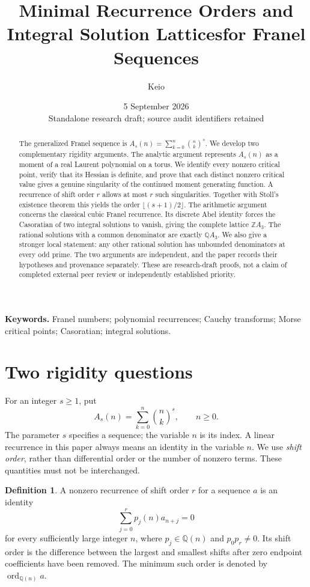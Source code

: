 \documentclass[11pt,a4paper]{article}
\author{Keio}
\date{5 September 2026\\\small Standalone research draft; source audit identifiers retained}
\title{Minimal Recurrence Orders and Integral Solution Lattices\newline for Franel Sequences}
\theoremstyle{definition}\newtheorem{definition}[theorem]{Definition}
\theoremstyle{remark}\newtheorem{remark}[theorem]{Remark}
\newcommand{\Q}{\mathbb Q}\newcommand{\Z}{\mathbb Z}\newcommand{\N}{\mathbb N}\newcommand{\R}{\mathbb R}\newcommand{\C}{\mathbb C}
\begin{document}
\maketitle
\begin{abstract}
The generalized Franel sequence is $A_s(n)=\sum_{k=0}^{n}\binom nk^s$.
We develop two complementary rigidity arguments. The analytic argument represents
$A_s(n)$ as a moment of a real Laurent polynomial on a torus. We identify every
nonzero critical point, verify that its Hessian is definite, and prove that each
distinct nonzero critical value gives a genuine singularity of the continued
moment generating function. A recurrence of shift order $r$ allows at most $r$
such singularities. Together with Stoll's existence theorem this yields the
order $\lfloor(s+1)/2\rfloor$. The arithmetic argument concerns the classical
cubic Franel recurrence. Its discrete Abel identity forces the Casoratian of two
integral solutions to vanish, giving the complete lattice $\Z A_3$. The rational
solutions with a common denominator are exactly $\Q A_3$. We also give a stronger
local statement: any other rational solution has unbounded denominators at
every odd prime. The two arguments are independent, and the paper records their
hypotheses and provenance separately. These are research-draft proofs, not a
claim of completed external peer review or independently established priority.
\end{abstract}
\noindent\textbf{Keywords.} Franel numbers; polynomial recurrences; Cauchy transforms;
Morse critical points; Casoratian; integral solutions.

\section{Two rigidity questions}
For an integer $s\ge1$, put
\begin{equation}\label{eq:defA}
 A_s(n)=\sum_{k=0}^{n}\binom nk^s,\qquad n\ge0.
\end{equation}
The parameter $s$ specifies a sequence; the variable $n$ is its index. A linear
recurrence in this paper always means an identity in the variable $n$. We use
\emph{shift order}, rather than differential order or the number of nonzero
terms. These quantities must not be interchanged.

\begin{definition}\label{def:order}
A nonzero recurrence of shift order $r$ for a sequence $a$ is an identity
\begin{equation}\label{eq:recdef}
 \sum_{j=0}^{r}p_j(n)a_{n+j}=0
\end{equation}
for every sufficiently large integer $n$, where $p_j\in\Q(n)$ and
$p_0p_r\ne0$. Its shift order is the difference between the largest and smallest
shifts after zero endpoint coefficients have been removed. The minimum such
order is denoted by $\operatorname{ord}_{\Q(n)}a$.
\end{definition}
\end{document}
